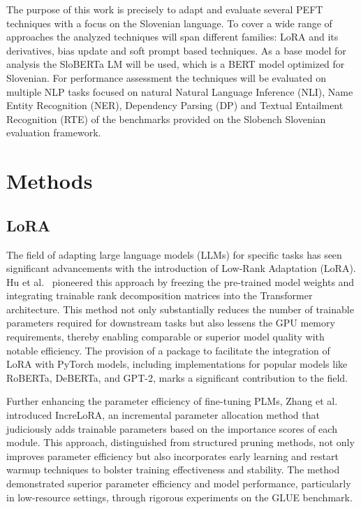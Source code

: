\documentclass[fleqn,moreauthors,10pt]{ds_report}
\begin{document}
    The purpose of this work is precisely to adapt and evaluate several PEFT techniques with a focus on the Slovenian language. To cover a wide range of approaches the analyzed techniques will span different families: LoRA\cite{hu2022lora} and its derivatives, bias update\cite{bitfit} and soft prompt based techniques. As a base model for analysis the SloBERTa LM will be used, which is a BERT model optimized for Slovenian. For performance assessment the techniques will be evaluated on multiple NLP tasks focused on natural Natural Language Inference (NLI), Name Entity Recognition (NER), Dependency Parsing (DP) and Textual Entailment Recognition (RTE) of the benchmarks provided on the Slobench Slovenian evaluation framework.


\newpage
\section*{Methods}

\subsection*{LoRA}

The field of adapting large language models (LLMs) for specific tasks has seen significant advancements with the introduction of Low-Rank Adaptation (LoRA). Hu et al.~\cite{hu2022lora} pioneered this approach by freezing the pre-trained model weights and integrating trainable rank decomposition matrices into the Transformer architecture. This method not only substantially reduces the number of trainable parameters required for downstream tasks but also lessens the GPU memory requirements, thereby enabling comparable or superior model quality with notable efficiency. The provision of a package to facilitate the integration of LoRA with PyTorch models, including implementations for popular models like RoBERTa, DeBERTa, and GPT-2, marks a significant contribution to the field.

Further enhancing the parameter efficiency of fine-tuning PLMs, Zhang et al.~\cite{zhang2023increlora} introduced IncreLoRA, an incremental parameter allocation method that judiciously adds trainable parameters based on the importance scores of each module. This approach, distinguished from structured pruning methods, not only improves parameter efficiency but also incorporates early learning and restart warmup techniques to bolster training effectiveness and stability. The method demonstrated superior parameter efficiency and model performance, particularly in low-resource settings, through rigorous experiments on the GLUE benchmark.
\end{document}
